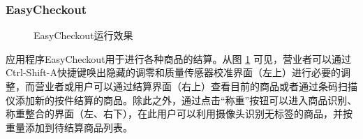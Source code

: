 \subsubsection{EasyCheckout}

\begin{figure}[htbp]
    \centering
    \hfill
    \vspace{1em}
    \hfill
	\caption{EasyCheckout运行效果}
	\label{fig:ec}
\end{figure}

应用程序EasyCheckout用于进行各种商品的结算。从图 \ref{fig:ec} 可见，营业者可以通过Ctrl-Shift-A快捷键唤出隐藏的调零和质量传感器校准界面（左上）进行必要的调整，而营业者或用户可以通过结算界面（右上）查看目前的商品或者通过条码扫描仪添加新的按件结算的商品。除此之外，通过点击“称重”按钮可以进入商品识别、称重整合的界面（左、右下），在此用户可以利用摄像头识别无标签的商品，并按重量添加到待结算商品列表。